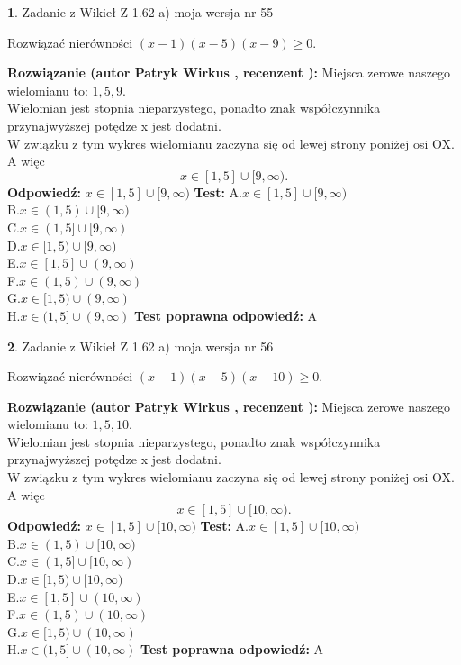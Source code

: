 \documentclass[12pt, a4paper]{article}
\theoremstyle{definition} %
\newtheorem{zad}{}
\newcommand{\zadStart}[1]{\begin{zad}#1\newline}
\newcommand{\zadStop}{\end{zad}}
\newcommand{\rozwStart}[2]{\noindent \textbf{Rozwiązanie (autor #1 , recenzent #2): }\newline}
\newcommand{\rozwStop}{\newline}
\newcommand{\odpStart}{\noindent \textbf{Odpowiedź:}\newline}
\newcommand{\odpStop}{\newline}
\newcommand{\testStart}{\noindent \textbf{Test:}\newline}
\newcommand{\testStop}{\newline}
\newcommand{\kluczStart}{\noindent \textbf{Test poprawna odpowiedź:}\newline}
\newcommand{\kluczStop}{\newline}
\begin{document}
\zadStart{Zadanie z Wikieł Z 1.62 a) moja wersja nr 55}

Rozwiązać nierówności $(x-1)(x-5)(x-9)\ge0$.
\zadStop
\rozwStart{Patryk Wirkus}{}
Miejsca zerowe naszego wielomianu to: $1, 5, 9$.\\
Wielomian jest stopnia nieparzystego, ponadto znak współczynnika przy\linebreak najwyższej potędze x jest dodatni.\\ W związku z tym wykres wielomianu zaczyna się od lewej strony poniżej osi OX. A więc $$x \in [1,5] \cup [9,\infty).$$
\rozwStop
\odpStart
$x \in [1,5] \cup [9,\infty)$
\odpStop
\testStart
A.$x \in [1,5] \cup [9,\infty)$\\
B.$x \in (1,5) \cup [9,\infty)$\\
C.$x \in (1,5] \cup [9,\infty)$\\
D.$x \in [1,5) \cup [9,\infty)$\\
E.$x \in [1,5] \cup (9,\infty)$\\
F.$x \in (1,5) \cup (9,\infty)$\\
G.$x \in [1,5) \cup (9,\infty)$\\
H.$x \in (1,5] \cup (9,\infty)$
\testStop
\kluczStart
A
\kluczStop



\zadStart{Zadanie z Wikieł Z 1.62 a) moja wersja nr 56}

Rozwiązać nierówności $(x-1)(x-5)(x-10)\ge0$.
\zadStop
\rozwStart{Patryk Wirkus}{}
Miejsca zerowe naszego wielomianu to: $1, 5, 10$.\\
Wielomian jest stopnia nieparzystego, ponadto znak współczynnika przy\linebreak najwyższej potędze x jest dodatni.\\ W związku z tym wykres wielomianu zaczyna się od lewej strony poniżej osi OX. A więc $$x \in [1,5] \cup [10,\infty).$$
\rozwStop
\odpStart
$x \in [1,5] \cup [10,\infty)$
\odpStop
\testStart
A.$x \in [1,5] \cup [10,\infty)$\\
B.$x \in (1,5) \cup [10,\infty)$\\
C.$x \in (1,5] \cup [10,\infty)$\\
D.$x \in [1,5) \cup [10,\infty)$\\
E.$x \in [1,5] \cup (10,\infty)$\\
F.$x \in (1,5) \cup (10,\infty)$\\
G.$x \in [1,5) \cup (10,\infty)$\\
H.$x \in (1,5] \cup (10,\infty)$
\testStop
\kluczStart
A
\kluczStop
\end{document}
